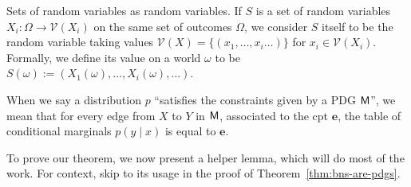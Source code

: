 \documentclass{article}
\newcommand{\V}{\mathcal V}
\numberwithin{equation}{section}
\begin{document}
\begin{defn} \label{def:set-rv}
	Sets of random variables as random variables. If $S$ is a set of random variables $X_i : \Omega \to \V(X_i)$ on the same set of outcomes $\Omega$, we consider $S$ itself to be the random variable taking values $\V(X) = \{(x_1, \ldots, x_i \ldots) \}$ for $x_i \in \V(X_i)$. Formally, we define its value on a world $\omega$ to be $S(\omega) := (X_1(\omega), \ldots, X_i(\omega), \ldots)$. 
\end{defn}


When we say a distribution $p$ ``satisfies the constraints given by a PDG $\sf M$'', we mean that for every edge from $X$ to $Y$ in $\sf M$, associated to the cpt $\mathbf e$, the table of conditional marginals $p(y \mid x)$ is equal to $\mathbf e$.

To prove our theorem, we now present a helper lemma, which will do most of the work. For context, skip to its usage in the proof of Theorem~\ref{thm:bns-are-pdgs}.
\end{document}

